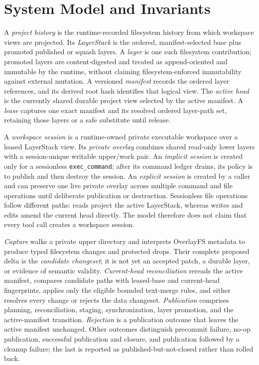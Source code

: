 \section{System Model and Invariants}
\label{sec:system-model}

A \emph{project history} is the runtime-recorded filesystem history from which
workspace views are projected.  Its \emph{LayerStack} is the ordered,
manifest-selected base plus promoted published or squash layers.  A
\emph{layer} is one such filesystem contribution; promoted layers are
content-digested and treated as append-oriented and immutable by the runtime,
without claiming filesystem-enforced immutability against external mutation.
A versioned \emph{manifest} records the ordered layer references, and its
derived root hash identifies that logical view.  The \emph{active head} is the
currently shared durable project view selected by the active manifest.  A
\emph{lease} captures one exact manifest and its resolved ordered layer-path
set, retaining those layers or a safe substitute until release.

A \emph{workspace session} is a runtime-owned private executable workspace over
a leased LayerStack view.  Its \emph{private overlay} combines shared
read-only lower layers with a session-unique writable upper/work pair.  An
\emph{implicit session} is created only for a sessionless
\texttt{exec\_command}; after its command ledger drains, its policy is to
publish and then destroy the session.  An \emph{explicit session} is created
by a caller and can preserve one live private overlay across multiple command
and file operations until deliberate publication or destruction.  Sessionless
file operations follow different paths: reads project the active LayerStack,
whereas writes and edits amend the current head directly.  The model therefore
does not claim that every tool call creates a workspace session.

\emph{Capture} walks a private upper directory and interprets OverlayFS
metadata to produce typed filesystem changes and protected drops.  Their
complete proposed delta is the \emph{candidate changeset}; it is not yet an
accepted patch, a durable layer, or evidence of semantic validity.
\emph{Current-head reconciliation} rereads the active manifest, compares
candidate paths with leased-base and current-head fingerprints, applies only
the eligible bounded text-merge rules, and either resolves every change or
rejects the data changeset.  \emph{Publication} comprises planning,
reconciliation, staging, synchronization, layer promotion, and the
active-manifest transition.  \emph{Rejection} is a publication outcome that
leaves the active manifest unchanged.  Other outcomes distinguish precommit
failure, no-op publication, successful publication and closure, and
publication followed by a cleanup failure; the last is reported as
published-but-not-closed rather than rolled back.

